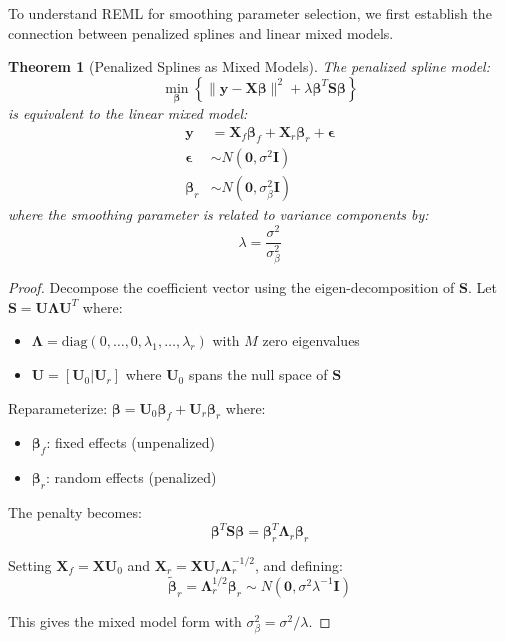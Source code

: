 \documentclass[12pt]{article}
\newtheorem{theorem}{Theorem}
\begin{document}
To understand REML for smoothing parameter selection, we first establish the connection between penalized splines and linear mixed models.

\begin{theorem}[Penalized Splines as Mixed Models]
The penalized spline model:
\begin{equation}
\min_{\bm{\beta}} \left\{ \|\mathbf{y} - \mathbf{X}\bm{\beta}\|^2 + \lambda \bm{\beta}^T \mathbf{S} \bm{\beta} \right\}
\end{equation}
is equivalent to the linear mixed model:
\begin{align}
\mathbf{y} &= \mathbf{X}_f\bm{\beta}_f + \mathbf{X}_r\bm{\beta}_r + \bm{\epsilon} \\
\bm{\epsilon} &\sim N(\mathbf{0}, \sigma^2\mathbf{I}) \\
\bm{\beta}_r &\sim N(\mathbf{0}, \sigma^2_{\beta}\mathbf{I})
\end{align}
where the smoothing parameter is related to variance components by:
\begin{equation}
\lambda = \frac{\sigma^2}{\sigma^2_{\beta}}
\end{equation}
\end{theorem}

\begin{proof}
Decompose the coefficient vector using the eigen-decomposition of $\mathbf{S}$. Let $\mathbf{S} = \mathbf{U}\bm{\Lambda}\mathbf{U}^T$ where:
\begin{itemize}
    \item $\bm{\Lambda} = \text{diag}(0, \ldots, 0, \lambda_1, \ldots, \lambda_r)$ with $M$ zero eigenvalues
    \item $\mathbf{U} = [\mathbf{U}_0 | \mathbf{U}_r]$ where $\mathbf{U}_0$ spans the null space of $\mathbf{S}$
\end{itemize}

Reparameterize: $\bm{\beta} = \mathbf{U}_0\bm{\beta}_f + \mathbf{U}_r\bm{\beta}_r$ where:
\begin{itemize}
    \item $\bm{\beta}_f$: fixed effects (unpenalized)
    \item $\bm{\beta}_r$: random effects (penalized)
\end{itemize}

The penalty becomes:
\begin{equation}
\bm{\beta}^T\mathbf{S}\bm{\beta} = \bm{\beta}_r^T\bm{\Lambda}_r\bm{\beta}_r
\end{equation}

Setting $\mathbf{X}_f = \mathbf{X}\mathbf{U}_0$ and $\mathbf{X}_r = \mathbf{X}\mathbf{U}_r\bm{\Lambda}_r^{-1/2}$, and defining:
\begin{equation}
\tilde{\bm{\beta}}_r = \bm{\Lambda}_r^{1/2}\bm{\beta}_r \sim N(\mathbf{0}, \sigma^2\lambda^{-1}\mathbf{I})
\end{equation}

This gives the mixed model form with $\sigma^2_{\beta} = \sigma^2/\lambda$.
\end{proof}
\end{document}
